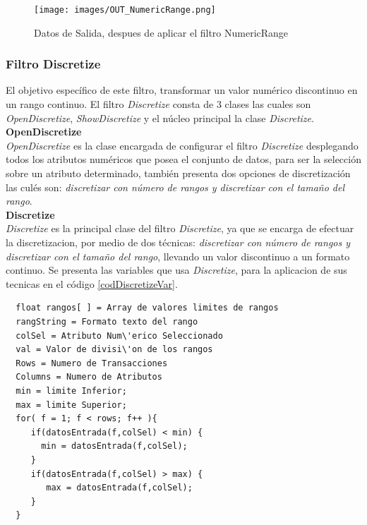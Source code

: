 \begin{figure}[h]
\centering
\texttt{[image: images/OUT\_NumericRange.png]}
\caption{Datos de Salida, despues de aplicar el filtro NumericRange}
\label{OUT_NumericRange}
\end{figure}

\subsubsection{Filtro Discretize}
El objetivo espec\'ifico de este filtro, transformar un valor num\'erico discontinuo en un rango continuo.
El filtro \textit{Discretize} consta de 3 clases las cuales son \textit{OpenDiscretize}, \textit{ShowDiscretize} y el n\'ucleo principal la clase \textit{Discretize}. \\

\textbf{OpenDiscretize} \\ 
\textit{OpenDiscretize} es la clase encargada de configurar el filtro \textit{Discretize} desplegando todos los atributos num\'ericos que posea el conjunto de datos, para ser la selecci\'on sobre un atributo determinado, tambi\'en presenta dos opciones de discretizaci\'on las cul\'es son: \textit{discretizar con n\'umero de rangos y discretizar con el tama\~no del rango}. \\

\textbf{Discretize} \\ 
\textit{Discretize} es la principal clase del filtro \textit{Discretize}, ya que se encarga de efectuar la discretizacion, por medio de dos t\'ecnicas: \textit{discretizar con n\'umero de rangos y discretizar con el tama\~no del rango}, llevando un valor discontinuo a un formato continuo.
Se presenta las variables que usa \textit{Discretize}, para la aplicacion de sus tecnicas en el c\'odigo \ref{codDiscretizeVar}. \\
 
\begin{codigof}[!h]
\begin{verbatim}
  float rangos[ ] = Array de valores limites de rangos
  rangString = Formato texto del rango
  colSel = Atributo Num\'erico Seleccionado
  val = Valor de divisi\'on de los rangos
  Rows = Numero de Transacciones
  Columns = Numero de Atributos
  min = limite Inferior;
  max = limite Superior;
  for( f = 1; f < rows; f++ ){ 
     if(datosEntrada(f,colSel) < min) {
       min = datosEntrada(f,colSel); 
     }
     if(datosEntrada(f,colSel) > max) {  
        max = datosEntrada(f,colSel); 
     }
  } 
\end{verbatim}
\caption{Argumentos de las variables}
\label{codDiscretizeVar}
\end{codigof}
   
